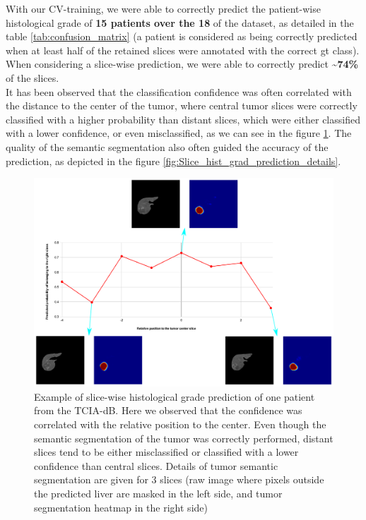 \documentclass[]{article}
\newcommand{\lmttfont}[1]{{\fontfamily{lmtt}\selectfont #1}}
\begin{document}
With our CV-training, we were able to correctly predict the patient-wise
histological grade of \textbf{15 patients over the 18} of the dataset, as detailed in the table \ref{tab:confusion_matrix} (a patient is considered as being correctly predicted
when at least half of the retained slices were annotated with the
correct \ac{gt} class).
When considering a slice-wise prediction, we were able to correctly
predict \textbf{\textasciitilde{}74\%} of the slices.\\
It has been observed that the classification confidence was often correlated with the distance to the center of the tumor, where central tumor slices were correctly classified with a higher probability than distant slices, which were either classified with a lower confidence, or even misclassified, as we can see in the figure \ref{fig:Slice_hist_grad_prediction_2}. The quality of the semantic segmentation also often guided the accuracy of the prediction, as depicted in the figure \ref{fig:Slice_hist_grad_prediction_details}.

\begin{figure}[th!]
	\centering
	\includegraphics[width=0.7\linewidth]{../HistologicalGradePrediction/images/Slice_hist_grad_prediction_2}
	\caption{Example of slice-wise histological grade prediction of one patient from the \lmttfont{TCIA-dB}. Here we observed that the confidence was correlated with the relative position to the center. Even though the semantic segmentation of the tumor was correctly performed, distant slices tend to be either misclassified or classified with a lower confidence than central slices. Details of tumor semantic segmentation are given for 3 slices (raw image where pixels outside the predicted liver are masked in the left side, and tumor segmentation heatmap in the right side)}
	\label{fig:Slice_hist_grad_prediction_2}
\end{figure}
\end{document}

